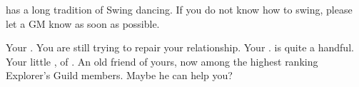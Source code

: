 \documentclass[char]{NeptuneBall}
\begin{document}
\begin{itemz}[Notes]
  \item \pAmerica{} has a long tradition of Swing dancing. If you do not know how to swing, please let a GM know as soon as possible.
\end{itemz}

\begin{contacts}
  \contact{\cKing{}} Your \cKing{\parent}. You are still trying to repair your relationship.
  \contact{\cWillow{}} Your \cWillow{\offspring}. \cWillow{\They} is quite a handful.
  \contact{\cPrincess{}} Your little \cPrincess{\sibling}, \cPrincess{\prince} of \pAtlantis{}.
  \contact{\cPriest{}} An old friend of yours, now among the highest ranking Explorer's Guild members. Maybe he can help you?
\end{contacts}
\end{document}
